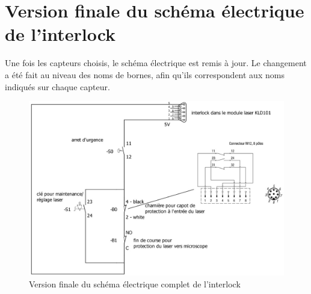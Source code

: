 \section{Version finale du schéma électrique de l'interlock}
Une fois les capteurs choisis, le schéma électrique est remis à jour. Le changement a été fait au niveau des noms de bornes, afin qu'ils correspondent aux noms indiqués sur chaque capteur.

\begin{figure}[H]
    \begin{center}
        \includegraphics[width=\textwidth]{assets/figures/Protections_laser/Securite_electrique/interlock_schema_elec_V2.jpg}
    \end{center}
    \caption{Version finale du schéma électrique complet de l'interlock}
    \label{schema_interlock_v2}
\end{figure}
\newpage
